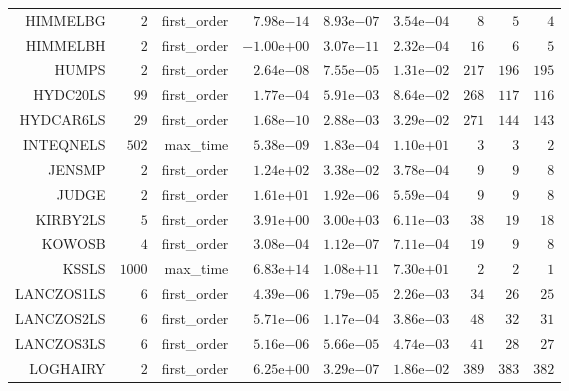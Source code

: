 \begin{longtable}{rrrrrrrrr}
HIMMELBG & \(     2\) & first\_order & \( 7.98\)e\(-14\) & \( 8.93\)e\(-07\) & \( 3.54\)e\(-04\) & \(     8\) & \(     5\) & \(     4\) \\
HIMMELBH & \(     2\) & first\_order & \(-1.00\)e\(+00\) & \( 3.07\)e\(-11\) & \( 2.32\)e\(-04\) & \(    16\) & \(     6\) & \(     5\) \\
HUMPS & \(     2\) & first\_order & \( 2.64\)e\(-08\) & \( 7.55\)e\(-05\) & \( 1.31\)e\(-02\) & \(   217\) & \(   196\) & \(   195\) \\
HYDC20LS & \(    99\) & first\_order & \( 1.77\)e\(-04\) & \( 5.91\)e\(-03\) & \( 8.64\)e\(-02\) & \(   268\) & \(   117\) & \(   116\) \\
HYDCAR6LS & \(    29\) & first\_order & \( 1.68\)e\(-10\) & \( 2.88\)e\(-03\) & \( 3.29\)e\(-02\) & \(   271\) & \(   144\) & \(   143\) \\
INTEQNELS & \(   502\) & max\_time & \( 5.38\)e\(-09\) & \( 1.83\)e\(-04\) & \( 1.10\)e\(+01\) & \(     3\) & \(     3\) & \(     2\) \\
JENSMP & \(     2\) & first\_order & \( 1.24\)e\(+02\) & \( 3.38\)e\(-02\) & \( 3.78\)e\(-04\) & \(     9\) & \(     9\) & \(     8\) \\
JUDGE & \(     2\) & first\_order & \( 1.61\)e\(+01\) & \( 1.92\)e\(-06\) & \( 5.59\)e\(-04\) & \(     9\) & \(     9\) & \(     8\) \\
KIRBY2LS & \(     5\) & first\_order & \( 3.91\)e\(+00\) & \( 3.00\)e\(+03\) & \( 6.11\)e\(-03\) & \(    38\) & \(    19\) & \(    18\) \\
KOWOSB & \(     4\) & first\_order & \( 3.08\)e\(-04\) & \( 1.12\)e\(-07\) & \( 7.11\)e\(-04\) & \(    19\) & \(     9\) & \(     8\) \\
KSSLS & \(  1000\) & max\_time & \( 6.83\)e\(+14\) & \( 1.08\)e\(+11\) & \( 7.30\)e\(+01\) & \(     2\) & \(     2\) & \(     1\) \\
LANCZOS1LS & \(     6\) & first\_order & \( 4.39\)e\(-06\) & \( 1.79\)e\(-05\) & \( 2.26\)e\(-03\) & \(    34\) & \(    26\) & \(    25\) \\
LANCZOS2LS & \(     6\) & first\_order & \( 5.71\)e\(-06\) & \( 1.17\)e\(-04\) & \( 3.86\)e\(-03\) & \(    48\) & \(    32\) & \(    31\) \\
LANCZOS3LS & \(     6\) & first\_order & \( 5.16\)e\(-06\) & \( 5.66\)e\(-05\) & \( 4.74\)e\(-03\) & \(    41\) & \(    28\) & \(    27\) \\
LOGHAIRY & \(     2\) & first\_order & \( 6.25\)e\(+00\) & \( 3.29\)e\(-07\) & \( 1.86\)e\(-02\) & \(   389\) & \(   383\) & \(   382\) \\

\end{longtable}

